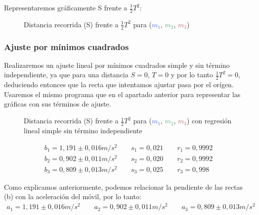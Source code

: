 \documentclass[12pt, a4paper, titlepage]{article}
\begin{document}
  Representaremos gráficamente S frente a $\frac{1}{2}T^2$:

  \begin{figure}[H]
    \hspace{-1.8cm} \centering
     

    \hspace{-1.8cm} 
    \caption{Distancia recorrida (S) frente a $\frac{1}{2}T^2$ para  (\textcolor{RoyalBlue}{$m_1$}, \textcolor{MediumSeaGreen}{$m_2$}, \textcolor{IndianRed}{$m_3$})}
  \end{figure}

  \subsubsection{Ajuste por mínimos cuadrados}

  Realizaremos un ajuste lineal por mínimos cuadrados simple y sin término independiente, ya que para una distancia $S=0$, $T=0$ y por lo tanto $\frac{1}{2}T^2 = 0$, deduciendo entonces que la recta que intentamos ajustar pasa por el orígen. Usaremos el mismo programa que en el apartado anterior para representar las gráficas con sus términos de ajuste.

  \begin{figure}[H]
    \hspace{-1.8cm} \centering
     

    \hspace{-1.8cm} 
    \caption{Distancia recorrida (S) frente a $\frac{1}{2}T^2$ para  (\textcolor{RoyalBlue}{$m_1$}, \textcolor{MediumSeaGreen}{$m_2$}, \textcolor{IndianRed}{$m_3$}) con regresión lineal simple sin término independiente}
  \end{figure}
  \begin{gather*}
    b_1 = 1,191 \pm 0,016 m/s^2 \qquad s_1 = 0,021 \qquad r_1 = 0,9992 \\
    b_2 = 0,902 \pm 0,011 m/s^2 \qquad s_2 = 0,020 \qquad r_2 = 0,9992 \\
    b_3 = 0,809 \pm 0,013 m/s^2 \qquad s_3 = 0,025 \qquad r_3 = 0,998
  \end{gather*}

  Como explicamos anteriormente, podemos relacionar la pendiente de las rectas (b) con la aceleración del móvil, por lo tanto:
  \begin{gather*}
    a_1 = 1,191 \pm 0,016 m/s^2 \qquad a_2 = 0,902 \pm 0,011 m/s^2 \qquad a_3 = 0,809 \pm 0,013 m/s^2
  \end{gather*}
\end{document}
